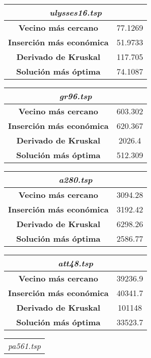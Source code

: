 \documentclass[12pt,spanish]{article}
\begin{document}
\begin{figure}[H]
\centering
\begin{tabular}{|c|c|}
\hline
\multicolumn{2}{|c|}{\textit{ulysses16.tsp}}\\
\hline
\textbf{Vecino más cercano} & 77.1269\\
\textbf{Inserción más económica} & 51.9733\\
\textbf{Derivado de Kruskal} & 117.705\\
\textbf{Solución más óptima} & 74.1087\\
\hline
\end{tabular}
\vspace{0.5cm}
\quad
\begin{tabular}{|c|c|}
\hline	
\multicolumn{2}{|c|}{\textit{gr96.tsp}}\\
\hline
\textbf{Vecino más cercano} & 603.302\\
\textbf{Inserción más económica} & 620.367\\
\textbf{Derivado de Kruskal} & 2026.4\\
\textbf{Solución más óptima} & 512.309\\
\hline	
\end{tabular}
\vspace{0.5cm}
\quad
\begin{tabular}{|c|c|}
\hline	
\multicolumn{2}{|c|}{\textit{a280.tsp}}\\
\hline
\textbf{Vecino más cercano} & 3094.28\\
\textbf{Inserción más económica} & 3192.42\\
\textbf{Derivado de Kruskal} & 6298.26\\
\textbf{Solución más óptima} & 2586.77\\
\hline	
\end{tabular}
\vspace{0.5cm}
\quad
\begin{tabular}{|c|c|}
\hline	
\multicolumn{2}{|c|}{\textit{att48.tsp}}\\
\hline
\textbf{Vecino más cercano} & 39236.9\\
\textbf{Inserción más económica} & 40341.7\\
\textbf{Derivado de Kruskal} & 101148\\
\textbf{Solución más óptima} & 33523.7\\
\hline	
\end{tabular}
\vspace{0.5cm}
\quad
\begin{tabular}{|c|c|}
\hline	
\multicolumn{2}{|c|}{\textit{pa561.tsp}}\\

\end{tabular}
\end{figure}
\end{document}
